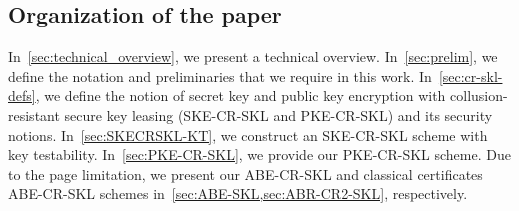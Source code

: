 



\ifnum{}
\subsection{Organization of the paper}
In~\cref{sec:technical_overview}, we present a technical overview.
In~\cref{sec:prelim}, we define the notation and preliminaries that we require in this work.  In~\cref{sec:cr-skl-defs}, we define the notion of secret key and public key encryption with collusion-resistant secure key leasing (SKE-CR-SKL and PKE-CR-SKL) and its security notions. In~\cref{sec:SKECRSKL-KT}, we construct an SKE-CR-SKL scheme with key testability. In~\cref{sec:PKE-CR-SKL}, we provide our PKE-CR-SKL scheme. Due to the page limitation, we present our ABE-CR-SKL and classical certificates ABE-CR-SKL schemes in~\cref{sec:ABE-SKL,sec:ABR-CR2-SKL}, respectively.
\else
\fi




